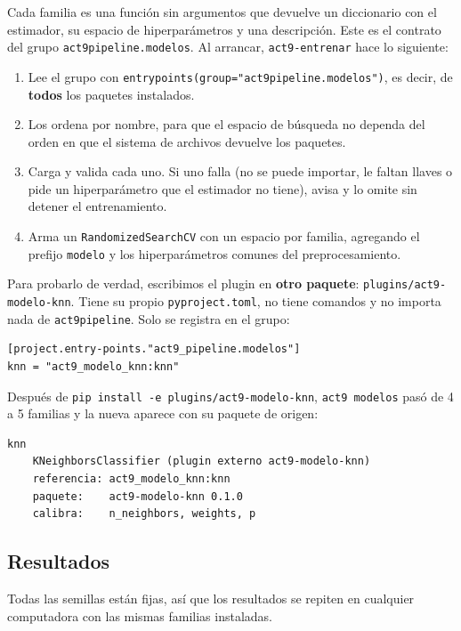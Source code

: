 \documentclass[12pt,a4paper]{article}
\renewcommand{\_}{\guionbajo\allowbreak}
\begin{document}
Cada familia es una función sin argumentos que devuelve un diccionario con el estimador, su
espacio de hiperparámetros y una descripción. Este es el contrato del grupo
\texttt{act9\_pipeline.modelos}. Al arrancar, \texttt{act9-entrenar} hace lo siguiente:

\begin{enumerate}[leftmargin=1.4em]
\item Lee el grupo con \texttt{entry\_points(group="act9\_pipeline.modelos")}, es decir, de
\textbf{todos} los paquetes instalados.
\item Los ordena por nombre, para que el espacio de búsqueda no dependa del orden en que el
sistema de archivos devuelve los paquetes.
\item Carga y valida cada uno. Si uno falla (no se puede importar, le faltan llaves o pide un
hiperparámetro que el estimador no tiene), avisa y lo omite sin detener el entrenamiento.
\item Arma un \texttt{RandomizedSearchCV} con un espacio por familia, agregando el prefijo
\texttt{modelo\_\_} y los hiperparámetros comunes del preprocesamiento.
\end{enumerate}

Para probarlo de verdad, escribimos el plugin en \textbf{otro paquete}:
\texttt{plugins/\allowbreak act9-\allowbreak modelo-knn}. Tiene su propio \texttt{pyproject.toml}, no tiene comandos y no
importa nada de \texttt{act9\_pipeline}. Solo se registra en el grupo:

\begin{verbatim}
[project.entry-points."act9_pipeline.modelos"]
knn = "act9_modelo_knn:knn"
\end{verbatim}

Después de \texttt{pip install -e plugins/act9-modelo-knn}, \texttt{act9 modelos} pasó de 4 a 5
familias y la nueva aparece con su paquete de origen:

\begin{verbatim}
knn
    KNeighborsClassifier (plugin externo act9-modelo-knn)
    referencia: act9_modelo_knn:knn
    paquete:    act9-modelo-knn 0.1.0
    calibra:    n_neighbors, weights, p
\end{verbatim}

\subsection{Resultados}

Todas las semillas están fijas, así que los resultados se repiten en cualquier computadora con
las mismas familias instaladas.
\end{document}
